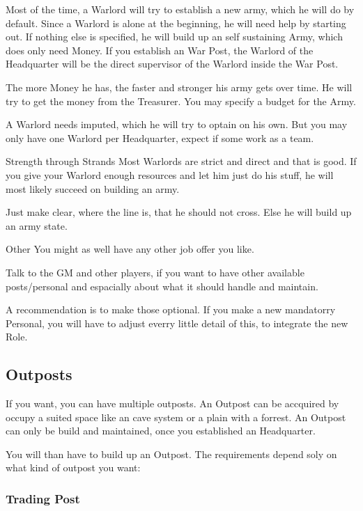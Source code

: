 Most of the time, a Warlord will try to establish a new army, which he will do by default. Since a Warlord is alone at the beginning, he will need help by starting out. If nothing else is specified, he will build up an self sustaining Army, which does only need Money. If you establish an War Post, the Warlord of the Headquarter will be the direct supervisor of the Warlord inside the War Post.

The more Money he has, the faster and stronger his army gets over time. He will try to get the money from the Treasurer. You may specify a budget for the Army.

A Warlord needs imputed, which he will try to optain on his own. But you may only have one Warlord per Headquarter, expect if some work as a team.

\begin{paperbox}{Strength through Strands}
Most Warlords are strict and direct and that is good. If you give your Warlord enough resources and let him just do his stuff, he will most likely succeed on building an army. 

Just make clear, where the line is, that he should not cross. Else he will build up an army state.
\end{paperbox}

\begin{commentbox}{Other}
You might as well have any other job offer you like.

Talk to the GM and other players, if you want to have other available posts/personal and espacially about what it should handle and maintain.

A recommendation is to make those optional. If you make a new mandatorry Personal, you will have to adjust everry little detail of this, to integrate the new Role.
\end{commentbox}


\subsection{Outposts}

If you want, you can have multiple outposts. An Outpost can be accquired by occupy a suited space like an cave system or a plain with a forrest. An Outpost can only be build and maintained, once you established an Headquarter.

You will than have to build up an Outpost. The requirements depend soly on what kind of outpost you want:

\subsubsection{Trading Post}

